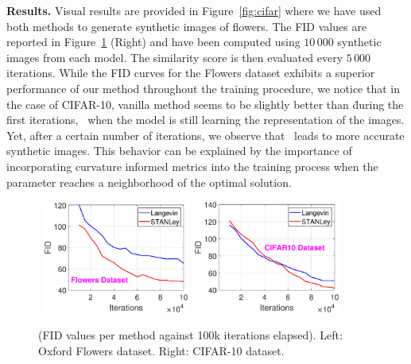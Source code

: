 \documentclass[10pt,twocolumn,letterpaper]{article}
\begin{document}
\medskip
\textbf{Results.} 
Visual results are provided in Figure~\ref{fig:cifar} where we have used both methods to generate synthetic images of flowers.
The FID values are reported in Figure~\ref{fig:fidall} (Right) and have been computed using $10\,000$ synthetic images from each model.
The similarity score is then evaluated every $5\,000$ iterations. 
While the FID curves for the Flowers dataset exhibits a superior performance of our method throughout the training procedure, we notice that in the case of CIFAR-10, vanilla method seems to be slightly better than \algo\. during the first iterations, \ie\ when the model is still learning the representation of the images.
Yet, after a certain number of iterations, we observe that \algo\ leads to more accurate synthetic images.
This behavior can be explained by the importance of incorporating curvature informed metrics into the training process when the parameter reaches a neighborhood of the optimal solution.




\begin{figure}[H]
\begin{center}
\mbox{\hspace{-0.2in}
        \includegraphics[width=1.9in]{figs/fid_flowers.eps} \hspace{-0.2in}
        \includegraphics[width=1.9in]{figs/fid_cifar.eps}
}
\end{center}
	\caption{(FID values per method against 100k iterations elapsed). Left: Oxford Flowers dataset. Right: CIFAR-10 dataset.}
	\label{fig:fidall}
\end{figure}
\end{document}
